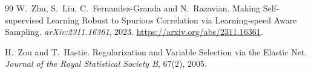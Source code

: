 \documentclass[11pt]{article}
\begin{document}
\begin{thebibliography}{99}
W.~Zhu, S.~Liu, C.~Fernandez-Granda and N.~Razavian. Making Self-supervised Learning Robust to Spurious Correlation via
Learning-speed Aware Sampling. \emph{arXiv:2311.16361}, 2023. \url{https://arxiv.org/abs/2311.16361}.

H.~Zou and T.~Hastie. Regularization and Variable Selection via the Elastic Net. \emph{Journal of the Royal Statistical
Society B}, 67(2), 2005.

\end{thebibliography}
\endgroup
\end{document}

